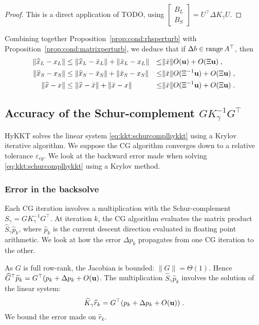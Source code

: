 \begin{proof}
  This is a direct application of TODO, using $\begin{bmatrix} B_L \\ B_S
  \end{bmatrix} = U^\top \Delta K_\gamma U$.
\end{proof}

Combining together Proposition~\ref{prop:cond:rhsperturb}
with Proposition~\ref{prop:cond:matrixperturb}, we deduce that
if $\Delta b \in \operatorname{range}{A^\top}$, then
\begin{equation}
  \begin{aligned}
    \| \widehat{x}_L - x_L  \| & \leq \|\widehat{x}_L - \bar{x}_L \|  + \|\bar{x}_L - x_L \|
    & \leq& \| \bar{x} \| O(\mathbf{u}) + O(\Xi\mathbf{u}) \;, \\
    \| \widehat{x}_S - x_S  \| & \leq \|\widehat{x}_S - \bar{x}_S \|  + \|\bar{x}_S - x_S \|
        & \leq& \| \bar{x} \| O(\Xi^{-1}\mathbf{u}) + O(\Xi\mathbf{u}) \;, \\
    \| \widehat{x} - x  \| & \leq \|\widehat{x} - \bar{x} \|  + \|\bar{x}- x \|
        & \leq& \| \bar{x} \| O(\Xi^{-1}\mathbf{u}) + O(\Xi \mathbf{u}) \;.
  \end{aligned}
\end{equation}




\subsection{Accuracy of the Schur-complement $G K_\gamma^{-1} G^\top$}
HyKKT solves the linear system \eqref{eq:kkt:schurcomplhykkt}
using a Krylov iterative algorithm. We suppose the CG algorithm converges
down to a relative tolerance $\varepsilon_{cg}$. We look at the backward
error made when solving \eqref{eq:kkt:schurcomplhykkt} using a Krylov method.

\subsubsection{Error in the backsolve}
Each CG iteration
involves a multiplication with the Schur-complement $S_\gamma = G K^{-1}_\gamma G^\top$.
At iteration $k$, the CG algorithm evaluates the matrix product $\widehat{S}_\gamma \widehat{p}_k$,
where $\widehat{p}_k$ is the current descent direction evaluated in
floating point arithmetic. We look at how the error $\Delta p_k$ propagates
from one CG iteration to the other.

As $G$ is full row-rank, the Jacobian is bounded: $\|G \| = \Theta(1)$.
Hence $\widehat{G}^\top \widehat{p}_k = G^\top (p_k + \Delta p_k + O(\mathbf{u})$.
The multiplication $\widehat{S}_\gamma \widehat{p}_k$ involves the
solution of the linear system:
\begin{equation}
  \widehat{K}_\gamma \widehat{r}_k = G^\top (p_k + \Delta p_k + O(\mathbf{u})) \; .
\end{equation}
We bound the error made on $\widehat{r}_k$.

